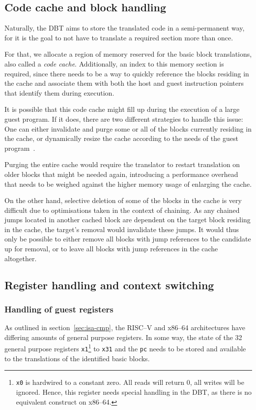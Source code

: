 \subsection{Code cache and block handling}
Naturally, the DBT aims to store the translated code in a semi-permanent way, for it is the goal to not have to translate a required section more than once.

For that, we allocate a region of memory reserved for the basic block translations, also called a \textit{code cache}.
Additionally, an index to this memory section is required, since there needs to be a way to quickly reference the blocks residing in the cache and associate them with both the host and guest instruction pointers that identify them during execution.


It is possible that this code cache might fill up during the execution of a large guest program.
If it does, there are two different strategies to handle this issue:
One can either invalidate and purge some or all of the blocks currently residing in the cache, or dynamically resize the cache according to the needs of the guest program~\cite[S. 3]{bintrans}.

Purging the entire cache would require the translator to restart translation on older blocks that might be needed again, introducing a performance overhead that needs to be weighed against the higher memory usage of enlarging the cache.

On the other hand, selective deletion of some of the blocks in the cache is very difficult due to optimisations taken in the context of chaining.
As any chained jumps located in another cached block are dependent on the target block residing in the cache, the target's removal would invalidate these jumps.
It would thus only be possible to either remove all blocks with jump references to the candidate up for removal, or to leave all blocks with jump references in the cache altogether.

\subsection{Register handling and context switching}
\label{sec:context-switch-reg-handle}

\subsubsection{Handling of guest registers}
\label{sec:reg-handle}
As outlined in section~\ref{sec:isa-cmp}, the RISC--V and x86--64 architectures have differing amounts of general purpose registers.
In some way, the state of the 32 general purpose registers \texttt{x1}\footnote{\texttt{x0} is hardwired to a constant zero. All reads will return 0, all writes will be ignored. Hence, this register needs special handling in the DBT, as there is no equivalent construct on x86--64.} to \texttt{x31} and the \texttt{pc} needs to be stored and available to the translations of the identified basic blocks.

